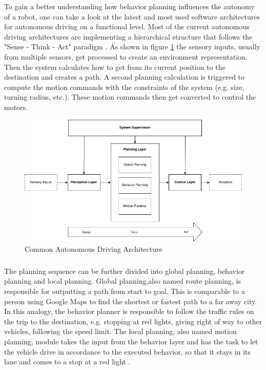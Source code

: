 To gain a better understanding how behavior planning influences the autonomy of a robot, one can take a look at the latest and most used software architectures for autonomous driving on a functional level. 
Most of the current autonomous driving architectures are implementing a hierarchical structure that follows the "Sense - Think - Act" paradigm \cite{murphy2000}. As shown in figure \ref{fig:autonomous_driving_architecture} the sensory inputs, usually from multiple sensors, get processed to create an environment representation. Then the system calculates how to get from its current position to the destination and creates a path. A second planning calculation is triggered to compute the motion commands with the constraints of the system (e.g. size, turning radius, etc.). These motion commands then get converted to control the motors. 
\begin{figure}[ht]
	\label{fig:autonomous_driving_architecture}
	\includegraphics[width=1.0\textwidth]{images/autonomous_driving_architecture.png}
	\caption{Common Autonomous Driving Architecture \cite{brooks1986} \cite{velasco2020}}
\end{figure}
\subparagraph*{}
The planning sequence can be further divided into global planning, behavior planning and local planning. Global planning,also named route planning, is responsible for outputting a path from start to goal. This is comparable to a person using Google Maps to find the shortest or fastest path to a far away city. In this analogy, the behavior planner is responsible to follow the traffic rules on the trip to the destination, e.g. stopping at red lights, giving right of way to other vehicles, following the speed limit. The local planning, also named motion planning, module takes the input from the behavior layer and has the task to let the vehicle drive in accordance to the executed behavior, so that it stays in its lane and comes to a stop at a red light \cite{reke2020}.

